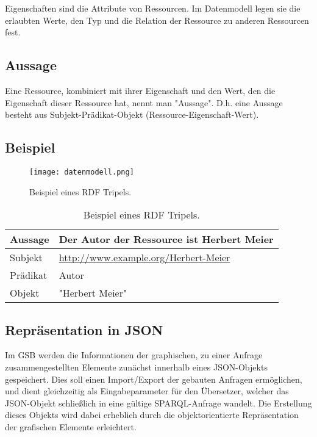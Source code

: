 Eigenschaften sind die Attribute von Ressourcen. Im Datenmodell legen sie die erlaubten Werte, den Typ und die Relation der Ressource zu anderen Ressourcen fest.

\subsection*{Aussage}

Eine Ressource, kombiniert mit ihrer Eigenschaft und den Wert, den die Eigenschaft dieser Ressource hat, nennt man "Aussage". D.h. eine Aussage besteht aus Subjekt-Prädikat-Objekt (Ressource-Eigenschaft-Wert).

\Hack{\pagebreak}


\subsection*{Beispiel}
\begin{SCfigure}[20][!h]%
\texttt{[image: datenmodell.png]}
\caption{Beispiel eines RDF Tripels.}\label{fig03}
\end{SCfigure}
\begin{SCtable}[20][!h]%
\caption{Beispiel eines RDF Tripels.}
\begin{tabular}{l l}\toprule
Aussage  & Der Autor der Ressource ist Herbert Meier \\\midrule
Subjekt  & \url{http://www.example.org/Herbert-Meier} \\
Prädikat & Autor \\
Objekt   & "Herbert Meier" \\\bottomrule
\end{tabular}
\end{SCtable}

\subsection*{Repräsentation in JSON}

Im GSB werden die Informationen der graphischen, zu einer Anfrage
zusammengestellten Elemente zunächst innerhalb eines JSON-Objekts
gespeichert.
Dies soll einen Import/Export der gebauten Anfragen ermöglichen, und
dient gleichzeitig als Eingabeparameter für den Übersetzer, welcher
das JSON-Objekt schließlich in eine gültige SPARQL-Anfrage wandelt.
Die Erstellung dieses Objekts wird dabei erheblich durch die objektorientierte Repräsentation der grafischen Elemente erleichtert.

